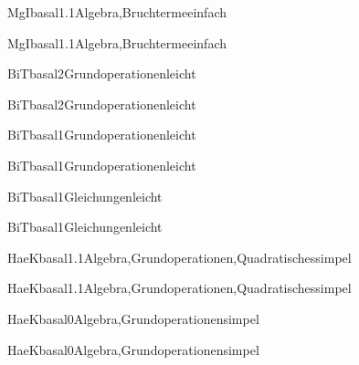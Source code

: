 \documentclass[12pt]{article}
\begin{document}
    \begin{Add}{MgI}{basal1.1}{Algebra,Bruchterme}{einfach}
    \solution{ }
    \end{Add}
    \begin{Add}{MgI}{basal1.1}{Algebra,Bruchterme}{einfach}
    \end{Add}
    

\begin{Add}{BiT}{basal2}{Grundoperationen}{leicht}
\solution{ }
\end{Add}
\begin{Add}{BiT}{basal2}{Grundoperationen}{leicht}
\end{Add}

\begin{Add}{BiT}{basal1}{Grundoperationen}{leicht}
\solution{ }
\end{Add}
\begin{Add}{BiT}{basal1}{Grundoperationen}{leicht}
\end{Add}

\begin{Add}{BiT}{basal1}{Gleichungen}{leicht}
\solution{ }
\end{Add}
\begin{Add}{BiT}{basal1}{Gleichungen}{leicht}
\end{Add}

\begin{Add}{HaeK}{basal1.1}{Algebra,Grundoperationen,Quadratisches}{simpel}
\solution{ }
\end{Add}
\begin{Add}{HaeK}{basal1.1}{Algebra,Grundoperationen,Quadratisches}{simpel}
\end{Add}

\begin{Add}{HaeK}{basal0}{Algebra,Grundoperationen}{simpel}
\solution{ }
\end{Add}
\begin{Add}{HaeK}{basal0}{Algebra,Grundoperationen}{simpel}
\end{Add}
\end{document}
